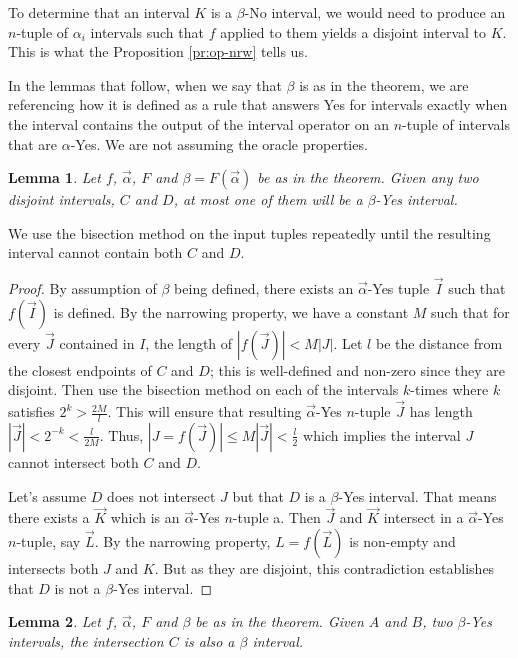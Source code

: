 \documentclass[12pt]{article}
\newtheorem{lemma}{Lemma}
\theoremstyle{remark}
\begin{document}
To determine that an interval $K$ is a $\beta$-No interval, we would need to produce an $n$-tuple of $\alpha_i$ intervals such that $f$ applied to them yields a disjoint interval to $K$. This is what the Proposition \ref{pr:op-nrw} tells us.  

In the lemmas that follow, when we say that $\beta$ is as in the theorem, we are referencing how it is defined as a rule that answers Yes for intervals exactly when the interval contains the output of the interval operator on an $n$-tuple of intervals that are $\alpha$-Yes. We are not assuming the oracle properties. 

\begin{lemma}
Let $f$, $\vec{\alpha}$, $F$ and $\beta = F(\vec{\alpha})$ be as in the theorem. Given any two disjoint intervals, $C$ and $D$, at most one of them will be a $\beta$-Yes interval.
\end{lemma}

We use the bisection method on the input tuples repeatedly until the resulting interval cannot contain both $C$ and $D$. 

\begin{proof}
By assumption of $\beta$ being defined, there exists an $\vec{\alpha}$-Yes tuple $\vec{I}$ such that $f(\vec{I})$ is defined. By the narrowing property, we have a constant $M$ such that for every $\vec{J}$ contained in $I$, the length of $|f(\vec{J})| < M |J|$. Let $l$ be the distance from the closest endpoints of $C$ and $D$; this is well-defined and non-zero since they are disjoint. Then use the bisection method on each of the intervals $k$-times where $k$ satisfies $2^k > \frac{2M}{l}$. This will ensure that resulting $\vec{\alpha}$-Yes $n$-tuple $\vec{J}$ has length $|\vec{J}| < 2^{-k} < \frac{l}{2M}$. Thus, $|J = f(\vec{J})| \leq M |\vec{J}| < \frac{l}{2}$ which implies the interval $J$ cannot intersect both $C$ and $D$. 

Let's assume $D$ does not intersect $J$ but that $D$ is a $\beta$-Yes interval. That means there exists a $\vec{K}$ which is an $\vec{\alpha}$-Yes $n$-tuple a. Then $\vec{J}$ and $\vec{K}$ intersect in a $\vec{\alpha}$-Yes $n$-tuple, say $\vec{L}$. By the narrowing property, $L = f(\vec{L})$ is non-empty and intersects both $J$ and $K$. But as they are disjoint, this contradiction establishes that $D$ is not a $\beta$-Yes interval. 
\end{proof}

\begin{lemma}
Let $f$, $\vec{\alpha}$, $F$ and $\beta$ be as in the theorem. Given $A$ and $B$, two $\beta$-Yes intervals, the intersection $C$ is also a $\beta$ interval. 
\end{lemma}
\end{document}
